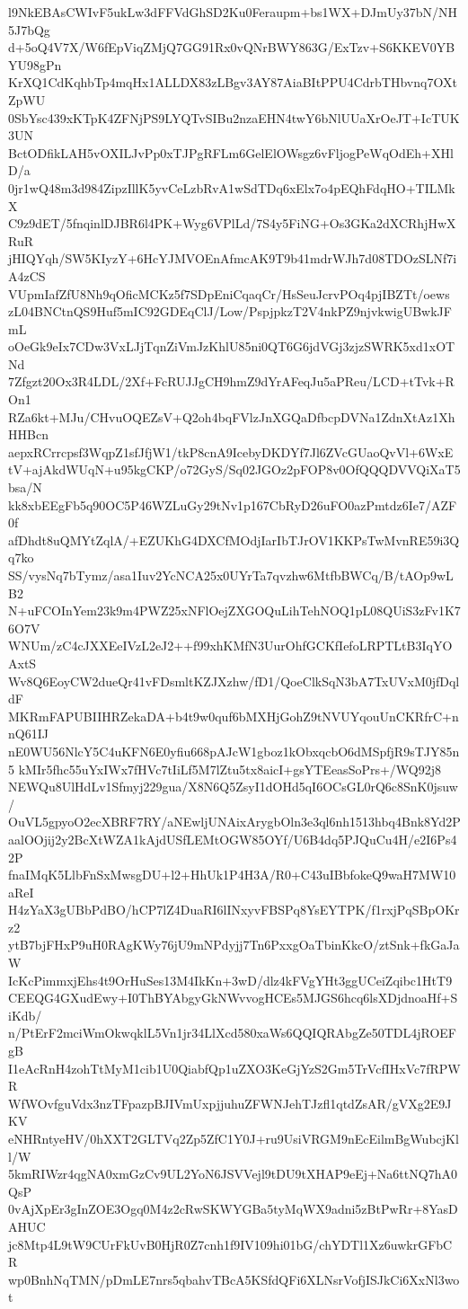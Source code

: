 l9NkEBAsCWIvF5ukLw3dFFVdGhSD2Ku0Feraupm+bs1WX+DJmUy37bN/NH5J7bQg
d+5oQ4V7X/W6fEpViqZMjQ7GG91Rx0vQNrBWY863G/ExTzv+S6KKEV0YBYU98gPn
KrXQ1CdKqhbTp4mqHx1ALLDX83zLBgv3AY87AiaBItPPU4CdrbTHbvnq7OXtZpWU
0SbYsc439xKTpK4ZFNjPS9LYQTvSIBu2nzaEHN4twY6bNlUUaXrOeJT+IcTUK3UN
BctODfikLAH5vOXILJvPp0xTJPgRFLm6GelElOWsgz6vFljogPeWqOdEh+XHlD/a
0jr1wQ48m3d984ZipzIllK5yvCeLzbRvA1wSdTDq6xElx7o4pEQhFdqHO+TILMkX
C9z9dET/5fnqinlDJBR6l4PK+Wyg6VPlLd/7S4y5FiNG+Os3GKa2dXCRhjHwXRuR
jHIQYqh/SW5KIyzY+6HcYJMVOEnAfmcAK9T9b41mdrWJh7d08TDOzSLNf7iA4zCS
VUpmIafZfU8Nh9qOficMCKz5f7SDpEniCqaqCr/HsSeuJcrvPOq4pjIBZTt/oews
zL04BNCtnQS9Huf5mIC92GDEqClJ/Low/PspjpkzT2V4nkPZ9njvkwigUBwkJFmL
oOeGk9eIx7CDw3VxLJjTqnZiVmJzKhlU85ni0QT6G6jdVGj3zjzSWRK5xd1xOTNd
7Zfgzt20Ox3R4LDL/2Xf+FcRUJJgCH9hmZ9dYrAFeqJu5aPReu/LCD+tTvk+ROn1
RZa6kt+MJu/CHvuOQEZsV+Q2oh4bqFVlzJnXGQaDfbcpDVNa1ZdnXtAz1XhHHBcn
aepxRCrrcpsf3WqpZ1sfJfjW1/tkP8cnA9IcebyDKDYf7Jl6ZVcGUaoQvVl+6WxE
tV+ajAkdWUqN+u95kgCKP/o72GyS/Sq02JGOz2pFOP8v0OfQQQDVVQiXaT5bsa/N
kk8xbEEgFb5q90OC5P46WZLuGy29tNv1p167CbRyD26uFO0azPmtdz6Ie7/AZF0f
afDhdt8uQMYtZqlA/+EZUKhG4DXCfMOdjIarIbTJrOV1KKPsTwMvnRE59i3Qq7ko
SS/vysNq7bTymz/asa1Iuv2YcNCA25x0UYrTa7qvzhw6MtfbBWCq/B/tAOp9wLB2
N+uFCOInYem23k9m4PWZ25xNFlOejZXGOQuLihTehNOQ1pL08QUiS3zFv1K76O7V
WNUm/zC4cJXXEeIVzL2eJ2++f99xhKMfN3UurOhfGCKfIefoLRPTLtB3IqYOAxtS
Wv8Q6EoyCW2dueQr41vFDsmltKZJXzhw/fD1/QoeClkSqN3bA7TxUVxM0jfDqldF
MKRmFAPUBIIHRZekaDA+b4t9w0quf6bMXHjGohZ9tNVUYqouUnCKRfrC+nnQ61IJ
nE0WU56NlcY5C4uKFN6E0yfiu668pAJcW1gboz1kObxqcbO6dMSpfjR9sTJY85n5
kMIr5fhc55uYxIWx7fHVc7tIiLf5M7lZtu5tx8aicI+gsYTEeasSoPrs+/WQ92j8
NEWQu8UlHdLv1Sfmyj229gua/X8N6Q5ZsyI1dOHd5qI6OCsGL0rQ6c8SnK0jsuw/
OuVL5gpyoO2ecXBRF7RY/aNEwljUNAixArygbOln3e3ql6nh1513hbq4Bnk8Yd2P
aalOOjij2y2BcXtWZA1kAjdUSfLEMtOGW85OYf/U6B4dq5PJQuCu4H/e2I6Ps42P
fnaIMqK5LlbFnSxMwsgDU+l2+HhUk1P4H3A/R0+C43uIBbfokeQ9waH7MW10aReI
H4zYaX3gUBbPdBO/hCP7lZ4DuaRI6lINxyvFBSPq8YsEYTPK/f1rxjPqSBpOKrz2
ytB7bjFHxP9uH0RAgKWy76jU9mNPdyjj7Tn6PxxgOaTbinKkcO/ztSnk+fkGaJaW
IcKcPimmxjEhs4t9OrHuSes13M4IkKn+3wD/dlz4kFVgYHt3ggUCeiZqibc1HtT9
CEEQG4GXudEwy+I0ThBYAbgyGkNWvvogHCEs5MJGS6hcq6lsXDjdnoaHf+SiKdb/
n/PtErF2mciWmOkwqklL5Vn1jr34LlXcd580xaWs6QQIQRAbgZe50TDL4jROEFgB
I1eAcRnH4zohTtMyM1cib1U0QiabfQp1uZXO3KeGjYzS2Gm5TrVcfIHxVc7fRPWR
WfWOvfguVdx3nzTFpazpBJIVmUxpjjuhuZFWNJehTJzfl1qtdZsAR/gVXg2E9JKV
eNHRntyeHV/0hXXT2GLTVq2Zp5ZfC1Y0J+ru9UsiVRGM9nEcEilmBgWubcjKll/W
5kmRIWzr4qgNA0xmGzCv9UL2YoN6JSVVejl9tDU9tXHAP9eEj+Na6ttNQ7hA0QsP
0vAjXpEr3gInZOE3Ogq0M4z2cRwSKWYGBa5tyMqWX9adni5zBtPwRr+8YasDAHUC
jc8Mtp4L9tW9CUrFkUvB0HjR0Z7cnh1f9IV109hi01bG/chYDTl1Xz6uwkrGFbCR
wp0BnhNqTMN/pDmLE7nrs5qbahvTBcA5KSfdQFi6XLNsrVofjISJkCi6XxNl3wot
